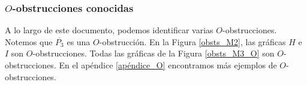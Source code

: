 \subsubsection{$O$-obstrucciones conocidas}

A lo largo de este documento, podemos identificar varias $O$-obstrucciones. Notemos que $\overline{P_3}$ es una $O$-obstrucción. En la Figura \ref{obsts_M2}, las gráficas $H$ e $I$ son $O$-obstrucciones. Todas las gráficas de la Figura \ref{obsts_M3_O} son $O$-obstrucciones. En el apéndice \ref{apéndice_O} encontramos más ejemplos de $O$-obstrucciones.